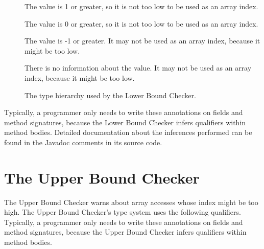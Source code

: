 \begin{description}
\item[]
  The value is 1 or greater, so it is not too low to be used as an array index.
\item[]
  The value is 0 or greater, so it is not too low to be used as an array index.
\item[]
  The value is -1 or greater.
  It may not be used as an array index, because it might be too low.
\item[]
  There is no information about the value.
  It may not be used as an array index, because it might be too low.
\end{description}

\begin{figure}
  \caption{The type hierarchy used by the Lower Bound Checker.}
  \label{fig-lowerbound-types}
\end{figure}


Typically, a programmer only needs to write these annotations on
fields and method signatures, because the Lower Bound Checker infers
qualifiers within method bodies.
Detailed documentation about the inferences performed can be found
in the Javadoc comments in its source code.


\section{The Upper Bound Checker\label{index-upperbound}}

The Upper Bound Checker warns about array accesses whose index might be
too high.
The Upper Bound Checker's type system uses the following qualifiers.
Typically, a programmer only needs to write these annotations on
fields and method signatures, because the Upper Bound Checker infers
qualifiers within method bodies.

